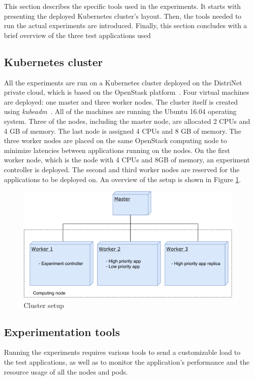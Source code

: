 This section describes the specific tools used in the experiments. It starts with presenting the deployed Kubernetes cluster's layout. Then, the tools needed to run the actual experiments are introduced. Finally, this section concludes with a brief overview of the three test applications used

\subsection{Kubernetes cluster}
\label{cluster}
All the experiments are run on a Kubernetes cluster deployed on the DistriNet private cloud, which is based on the OpenStask platform~\citep{openstack}. Four virtual machines are deployed: one master and three worker nodes. The cluster itself is created using \textit{kubeadm}~\citep{kubeadm}. All of the machines are running the Ubuntu 16.04 operating system. Three of the nodes, including the master node, are allocated 2 CPUs and 4 GB of memory. The last node is assigned 4 CPUs and 8 GB of memory. The three worker nodes are placed on the same OpenStack computing node to minimize latencies between applications running on the nodes. On the first worker node, which is the node with 4 CPUs and 8GB of memory, an experiment controller is deployed. The second and third worker nodes are reserved for the applications to be deployed on. An overview of the setup is shown in Figure \ref{fig:cluster}.

\begin{figure}
\centering
\includegraphics[width=0.75\columnwidth]{Images/Setup/Cluster.pdf}
\caption{Cluster setup}
\label{fig:cluster} 
\end{figure}


\subsection{Experimentation tools}
\label{tools}

Running the experiments requires various tools to send a customizable load to the test applications, as well as to monitor the application's performance and the resource usage of all the nodes and pods. 

